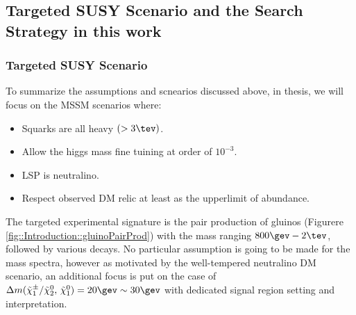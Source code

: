 





\clearpage
\subsection{Targeted SUSY Scenario and the Search Strategy in this work} 
\subsubsection{Targeted SUSY Scenario }
To summarize the assumptions and scnearios discussed above, in thesis, we will focus on the MSSM scenarios where:
\begin{itemize}
 \item Squarks are all heavy $(>3\tev)$.
 \item Allow the higgs mass fine tuining at order of $10^{-3}$.
 \item LSP is neutralino.
 \item Respect observed DM relic at least as the upperlimit of abundance.
\end{itemize}

The targeted experimental signature is the pair production of gluinos (Figurere \ref{fig::Introduction::gluinoPairProd}) with the mass ranging $800\gev-2\tev$, followed by various decays. No particular assumption is going to be made for the mass spectra, however as motivated by the well-tempered neutralino DM scenario, an additional focus is put on the case of $\dmcn = 20\gev \sim 30\gev$ with dedicated signal region setting and interpretation. \\

